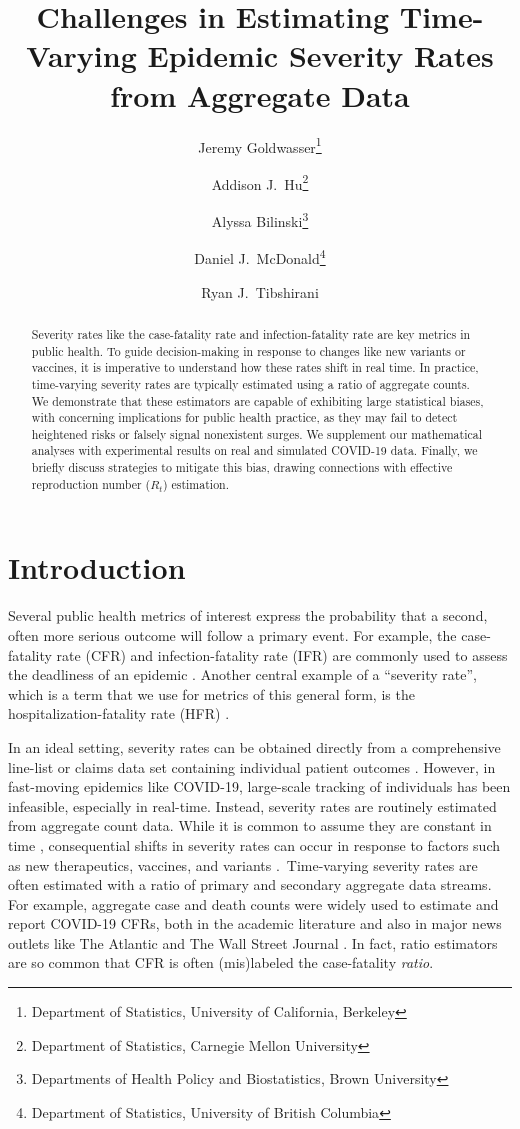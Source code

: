 \documentclass{article}
\title{Challenges in Estimating Time-Varying Epidemic Severity Rates from
  Aggregate Data}
\author{Jeremy Goldwasser\thanks{Department of Statistics, University of
    California, Berkeley} 
  \and  
  Addison J.\ Hu\thanks{Department of Statistics, Carnegie Mellon University}
  \and 
  Alyssa Bilinski\thanks{Departments of Health Policy and Biostatistics, Brown University} 
  \and
  Daniel J.\ McDonald\thanks{Department of Statistics, University of British
    Columbia} 
  \and 
  Ryan J.\ Tibshirani\footnotemark[1]}
\date{}
\begin{document}
\maketitle

\begin{abstract}
Severity rates like the case-fatality rate and infection-fatality rate are
key metrics in public health. To guide decision-making in response to changes
like new variants or vaccines, it is imperative to understand how these rates
shift in real time. In practice, time-varying severity rates are typically
estimated using a ratio of aggregate counts. We demonstrate that these
estimators are capable of exhibiting large statistical biases, with concerning
implications for public health practice, as they may fail to detect heightened 
risks or falsely signal nonexistent surges. We supplement our mathematical 
analyses with experimental results on real and simulated COVID-19 data. Finally,
we briefly discuss strategies to mitigate this bias, drawing connections with
effective reproduction number ($R_t$) estimation.    
\end{abstract}

\section{Introduction}

Several public health metrics of interest express the probability that a second,
often more serious outcome will follow a primary event. For example, the
case-fatality rate (CFR) and infection-fatality rate (IFR) are commonly used to
assess the deadliness of an epidemic \citep{nishiuraEx1, nishiuraEx2,
  cfr_line_list, timevar_ifr, lancet_ifr}. Another central example of a
``severity rate'', which is a term that we use for metrics of this general form,
is the hospitalization-fatality rate (HFR) \citep{HFR_linelist3, HFR_linelist1,  
  HFR_linelist2}.

In an ideal setting, severity rates can be obtained directly from a
comprehensive line-list or claims data set containing individual patient
outcomes \citep{HFR_linelist3, cfr_line_list, HFR_linelist1, HFR_linelist2}.
However, in fast-moving epidemics like COVID-19, large-scale tracking of
individuals has been infeasible, especially in real-time. Instead, severity
rates are routinely estimated from aggregate count data. While it is common to
assume they are constant in time \citep{ghani, jewell2007nonparametric,
  reich2012estimating, lancet_controversial}, consequential shifts in severity
rates can occur in response to factors such as new therapeutics, vaccines, and
variants \citep{nyt}. Time-varying severity rates are often estimated with a
ratio of primary and secondary aggregate data streams. For example, aggregate 
case and death counts were widely used to estimate and report COVID-19 CFRs, 
both in the academic literature \citep{yuan2020monitoring, timevar_ifr,
  horita2022global, LIU2023100350, germany} and also in major news outlets like
The Atlantic \citep{atlantic} and The Wall Street Journal \citep{wsj}. In fact,
ratio estimators are so common that CFR is often (mis)labeled the case-fatality
\emph{ratio}. 
\end{document}
